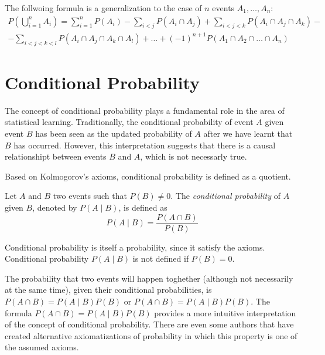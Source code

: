 The follwoing formula is a generalization to the case of $n$ events $A_1, \ldots, A_n$:
\begin{multline}
P \left( \bigcup_{i=1}^n A_i \right) = \sum_{i=1}^n P \left( A_i \right) - \sum_{i<j} P \left( A_i \cap A_j \right) + \sum_{i<j<k} P \left( A_i \cap A_j \cap A_k \right) - \\
 - \sum_{i<j<k<l} P \left( A_i \cap A_j \cap A_k \cap A_l \right) + \ldots +  (-1)^{n+1} P \left( A_1 \cap A_2 \cap \ldots \cap A_n \right) 
\end{multline}

%
%

\section{Conditional Probability}
\label{sec:probability_conditional}

The concept of conditional probability plays a fundamental role in the area of statistical learning. Traditionally, the conditional probability of event $A$ given event $B$ has been seen as the updated probability of $A$ after we have learnt that $B$ has occurred. However, this interpretation suggests that there is a causal relationshipt between events $B$ and $A$, which is not necessarly true.

Based on Kolmogorov's axioms, conditional probability is defined as a quotient.

\begin{definition}
Let $A$ and $B$ two events such that $P \left( B \right) \neq 0$. The \emph{conditional probability} of $A$ given $B$, denoted by $P \left( A \mid B \right)$, is defined as
\[
P\left(A\mid B\right) = \frac{P\left(A\cap B\right)}{P\left(B\right)}
\]
\end{definition}

Conditional probability is itself a probability, since it satisfy the axioms. Conditional probability $P\left(A\mid B\right)$ is not defined if $P\left(B\right)=0$.

The probability that two events will happen toghether (although not necessarily at the same time), given their conditional probabilities, is $P \left( A \cap B \right) = P \left( A \mid B \right) P \left( B \right)$ or $P \left( A \cap B \right) = P \left( A \mid B \right) P \left( B \right)$. The formula $P \left( A \cap B \right) = P \left( A \mid B \right) P \left( B \right)$ provides a more intuitive interpretation of the concept of conditional probability. There are even some authors that have created alternative axiomatizations of probability in which this property is one of the assumed axioms.

